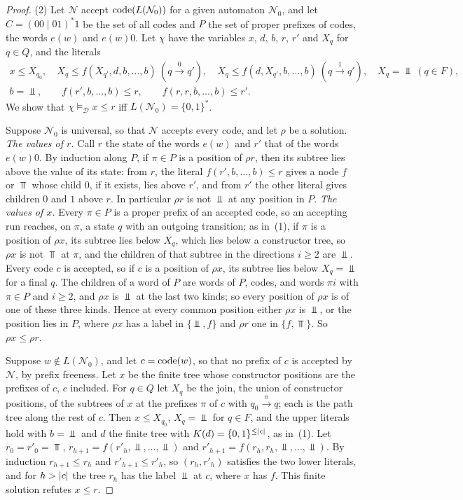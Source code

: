 \begin{proof}
(2) Let $\mathcal N$ accept $\operatorname{code}(L(\mathcal N_0))$ for a given automaton
$\mathcal N_0$, and let $C=(00\mid01)^*1$ be the set of all codes and $P$ the set
of proper prefixes of codes, the words $e(w)$ and $e(w)0$. Let $\chi$ have the
variables $x$, $d$, $b$, $r$, $r'$ and $X_q$ for $q\in Q$, and the literals
\[
\begin{gathered}
 x\le X_{q_0},\quad X_q\le f(X_{q'},d,b,\ldots,b)\ (q\xrightarrow0q'),\quad
 X_q\le f(d,X_{q'},b,\ldots,b)\ (q\xrightarrow1q'),\quad X_q=\Bot\ (q\in F),\\
 b=\Bot,\qquad f(r',b,\ldots,b)\le r,\qquad f(r,r,b,\ldots,b)\le r' .
\end{gathered}
\]
We show that $\chi\models_{\mathcal D}x\le r$ iff $L(\mathcal N_0)=\{0,1\}^*$.

Suppose $\mathcal N_0$ is universal, so that $\mathcal N$ accepts every code,
and let $\rho$ be a solution. \emph{The values of $r$.} Call $r$ the state of
the words $e(w)$ and $r'$ that of the words $e(w)0$. By induction along $P$, if
$\pi\in P$ is a position of $\rho r$, then its subtree lies above the value of
its state: from $r$, the literal $f(r',b,\ldots,b)\le r$ gives a node $f$ or
$\Top$ whose child $0$, if it exists, lies above $r'$, and from $r'$ the other
literal gives children $0$ and $1$ above $r$. In particular $\rho r$ is not
$\Bot$ at any position in $P$. \emph{The values of $x$.} Every $\pi\in P$ is a
proper prefix of an accepted code, so an accepting run reaches, on $\pi$, a
state $q$ with an outgoing transition; as in~(1), if $\pi$ is a position of
$\rho x$, its subtree lies below $X_q$, which lies below a constructor tree, so
$\rho x$ is not $\Top$ at $\pi$, and the children of that subtree in the
directions $i\ge2$ are $\Bot$. Every code $c$ is accepted, so if $c$ is a
position of $\rho x$, its subtree lies below $X_q=\Bot$ for a final $q$. The
children of a word of $P$ are words of $P$, codes, and words $\pi i$ with
$\pi\in P$ and $i\ge2$, and $\rho x$ is $\Bot$ at the last two kinds; so every
position of $\rho x$ is of one of these three kinds. Hence at every common
position either $\rho x$ is $\Bot$, or the position lies in $P$, where $\rho x$
has a label in $\{\Bot,f\}$ and $\rho r$ one in $\{f,\Top\}$. So
$\rho x\le\rho r$.

Suppose $w\notin L(\mathcal N_0)$, and let $c=\operatorname{code}(w)$, so that no prefix of
$c$ is accepted by $\mathcal N$, by prefix freeness. Let $x$ be the finite tree
whose constructor positions are the prefixes of $c$, $c$ included. For $q\in Q$
let $X_q$ be the join, the union of constructor positions, of the subtrees of
$x$ at the prefixes $\pi$ of $c$ with $q_0\xrightarrow\pi q$; each is the path
tree along the rest of $c$. Then $x\le X_{q_0}$, $X_q=\Bot$ for $q\in F$, and
the upper literals hold with $b=\Bot$ and $d$ the finite tree with
$K(d)=\{0,1\}^{\le\lvert c\rvert}$, as in~(1). Let $r_0=r'_0=\Top$,
$r_{h+1}=f(r'_h,\Bot,\ldots,\Bot)$ and $r'_{h+1}=f(r_h,r_h,\Bot,\ldots,\Bot)$. By
induction $r_{h+1}\le r_h$ and $r'_{h+1}\le r'_h$, so $(r_h,r'_h)$ satisfies the
two lower literals, and for $h>\lvert c\rvert$ the tree $r_h$ has the label $\Bot$ at
$c$, where $x$ has $f$. This finite solution refutes $x\le r$.


\end{proof}
